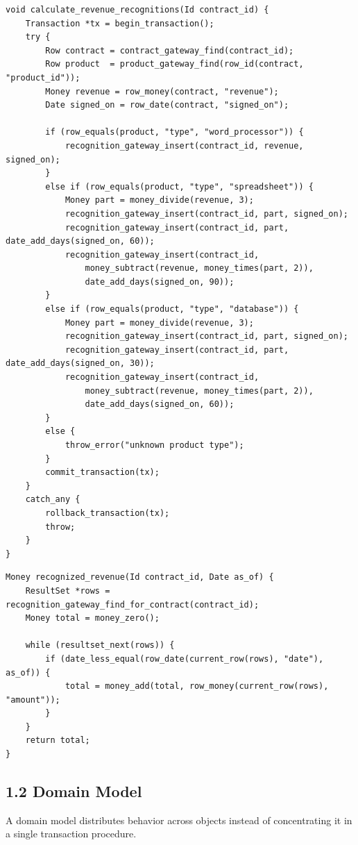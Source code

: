 \documentclass[11pt]{article}
\begin{document}
\begin{verbatim}
void calculate_revenue_recognitions(Id contract_id) {
    Transaction *tx = begin_transaction();
    try {
        Row contract = contract_gateway_find(contract_id);
        Row product  = product_gateway_find(row_id(contract, "product_id"));
        Money revenue = row_money(contract, "revenue");
        Date signed_on = row_date(contract, "signed_on");

        if (row_equals(product, "type", "word_processor")) {
            recognition_gateway_insert(contract_id, revenue, signed_on);
        }
        else if (row_equals(product, "type", "spreadsheet")) {
            Money part = money_divide(revenue, 3);
            recognition_gateway_insert(contract_id, part, signed_on);
            recognition_gateway_insert(contract_id, part, date_add_days(signed_on, 60));
            recognition_gateway_insert(contract_id,
                money_subtract(revenue, money_times(part, 2)),
                date_add_days(signed_on, 90));
        }
        else if (row_equals(product, "type", "database")) {
            Money part = money_divide(revenue, 3);
            recognition_gateway_insert(contract_id, part, signed_on);
            recognition_gateway_insert(contract_id, part, date_add_days(signed_on, 30));
            recognition_gateway_insert(contract_id,
                money_subtract(revenue, money_times(part, 2)),
                date_add_days(signed_on, 60));
        }
        else {
            throw_error("unknown product type");
        }
        commit_transaction(tx);
    }
    catch_any {
        rollback_transaction(tx);
        throw;
    }
}
\end{verbatim}

\begin{verbatim}
Money recognized_revenue(Id contract_id, Date as_of) {
    ResultSet *rows = recognition_gateway_find_for_contract(contract_id);
    Money total = money_zero();

    while (resultset_next(rows)) {
        if (date_less_equal(row_date(current_row(rows), "date"), as_of)) {
            total = money_add(total, row_money(current_row(rows), "amount"));
        }
    }
    return total;
}
\end{verbatim}

\subsection{1.2 Domain Model}\label{domain-model}

A domain model distributes behavior across objects instead of
concentrating it in a single transaction procedure.
\end{document}
